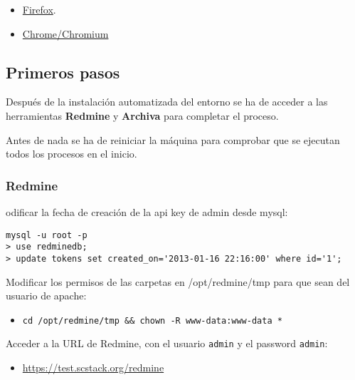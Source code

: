 \begin{itemize}
	\item \href{http://www.mozilla.org/es-ES/firefox/new/}{Firefox}.
	\item \href{https://www.google.com/intl/es/chrome/browser/?hl=es}{Chrome/Chromium}

\end{itemize}

\subsection{Primeros pasos}
\label{sub:primeros-pasos}

\par Después de la instalación automatizada del entorno se ha de acceder a las herramientas \textbf{Redmine} y \textbf{Archiva} para completar el proceso.

\par Antes de nada se ha de reiniciar la máquina para comprobar que se ejecutan todos los procesos en el inicio.

\subsubsection{Redmine}
\label{subs:conf-redmine}

\par odificar la fecha de creación de la api key de admin desde mysql:

\lstset{style=rubybasico}
\begin{lstlisting}[frame=trbl]
mysql -u root -p
> use redminedb;
> update tokens set created_on='2013-01-16 22:16:00' where id='1';
\end{lstlisting}

\par Modificar los permisos de las carpetas en /opt/redmine/tmp para que sean del usuario de apache:

\begin{itemize}
\item
  \texttt{cd /opt/redmine/tmp \&\& chown -R www-data:www-data *}
\end{itemize}
Acceder a la URL de Redmine, con el usuario \texttt{admin} y el password
\texttt{admin}:

\begin{itemize}
\item \href{https://test.scstack.org/redmine}{https://test.scstack.org/redmine}
\end{itemize}

